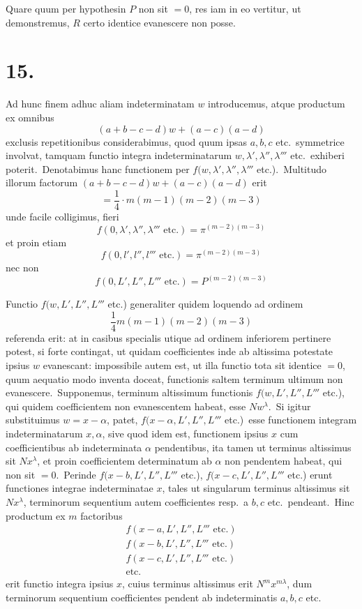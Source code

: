 \documentclass[12pt,a4paper]{article}
\theoremstyle{plain}
\begin{document}
Quare quum per hypothesin $P$ non sit $= 0$, res iam in eo vertitur, ut demonstremus, $R$ certo identice evanescere non posse.

\section*{15.}

Ad hunc finem adhuc aliam indeterminatam $w$ introducemus, atque productum ex omnibus
\[
(a+b-c-d)w + (a-c)(a-d)
\]
exclusis repetitionibus considerabimus, quod quum ipsas $a, b, c$ etc.\ symmetrice
involvat, tamquam functio integra indeterminatarum $w, \lambda', \lambda'', \lambda'''$ etc.\ exhiberi
poterit.\ Denotabimus hanc functionem per $f(w, \lambda', \lambda'', \lambda'''$ etc.).\ Multitudo illorum factorum
$(a+b-c-d)w + (a-c)(a-d)$ erit
\[
= \frac{1}{4} \cdot m(m-1)(m-2)(m-3)
\]
unde facile colligimus, fieri
\[
f(0, \lambda', \lambda'', \lambda''' \text{ etc.}) = \pi^{(m-2)(m-3)}
\]
et proin etiam
\[
f(0, l', l'', l''' \text{ etc.}) = \pi^{(m-2)(m-3)}
\]
nec non
\[
f(0, L', L'', L''' \text{ etc.}) = P^{(m-2)(m-3)}
\]

Functio $f(w, L', L'', L'''$ etc.) generaliter quidem loquendo ad ordinem
\[
\frac{1}{4}m(m-1)(m-2)(m-3)
\]
referenda erit: at in casibus specialis utique ad ordinem inferiorem pertinere
potest, si forte contingat, ut quidam coefficientes inde ab altissima potestate ipsius
$w$ evanescant: impossibile autem est, ut illa functio tota sit identice $= 0$, quum
aequatio modo inventa doceat, functionis saltem terminum ultimum non evanescere.\ Supponemus, terminum altissimum functionis $f(w, L', L'', L'''$ etc.), qui
quidem coefficientem non evanescentem habeat, esse $Nw^\lambda$.\ Si igitur substituimus
$w = x - \alpha$, patet, $f(x-\alpha, L', L'', L'''$ etc.)\ esse functionem integram indeterminatarum $x, \alpha$, sive quod idem est, functionem ipsius $x$ cum coefficientibus ab
indeterminata $\alpha$ pendentibus, ita tamen ut terminus altissimus sit $Nx^\lambda$, et proin
coefficientem determinatum ab $\alpha$ non pendentem habeat, qui non sit $= 0$.\ Perinde $f(x-b, L', L'', L'''$ etc.), $f(x-c, L', L'', L'''$ etc.) erunt functiones integrae
indeterminatae $x$, tales ut singularum terminus altissimus sit $Nx^\lambda$, terminorum
sequentium autem coefficientes resp.\ a $b, c$ etc.\ pendeant.\ Hinc productum ex
$m$ factoribus
\begin{gather*}
f(x-a, L', L'', L''' \text{ etc.}) \\
f(x-b, L', L'', L''' \text{ etc.}) \\
f(x-c, L', L'', L''' \text{ etc.}) \\
\text{etc.}
\end{gather*}
erit functio integra ipsius $x$, cuius terminus altissimus erit $N^m x^{m\lambda}$, dum terminorum sequentium coefficientes pendent ab indeterminatis $a, b, c$ etc.
\end{document}
